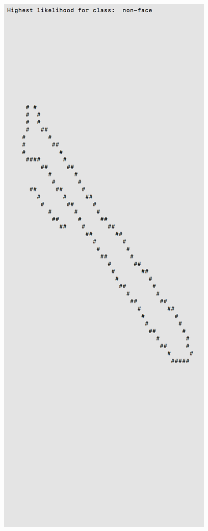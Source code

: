\documentclass[11pt]{article}
\begin{document}
\begin{center}
\includegraphics[scale=0.6]{part1/extra/high_nonface.png}
\end{center}
\end{document}
